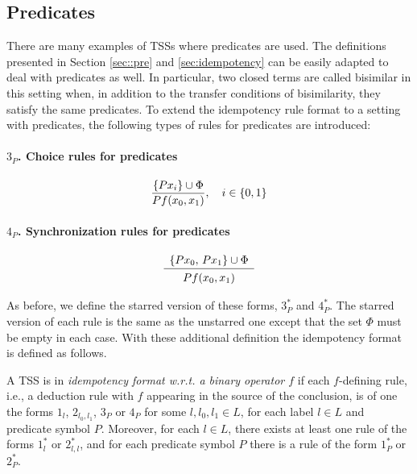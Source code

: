 
\subsection{Predicates\label{sec::pred}}

There are many examples of TSSs where predicates are used.
The definitions presented in Section \ref{sec::pre} and  \ref{sec:idempotency} can be easily adapted to deal with predicates as well.
In particular, two closed terms are called bisimilar in this setting when,
in addition to the transfer conditions of bisimilarity, they satisfy the same predicates.
To extend the idempotency rule format to a setting with predicates, the following types of rules for predicates are introduced:

\paragraph{$3_P$. Choice rules for predicates}
\[
    \sosrule[i\in\{0,1\}]{\{P x_i\}\cup\Phi}{P f(x_0,x_1)} \\
\]
\paragraph{$4_{P}$. Synchronization rules for predicates}
\[
    \sosrule{\{P x_0,\, P x_1\}\cup\Phi}{P f(x_0,x_1)}
\]

As before, we define the starred version of these forms, $3_P^*$ and $4_{P}^*$. The starred version of each rule is the same as the unstarred one except that the set $\Phi$ must be
empty in each case. With these additional definition the idempotency format is defined as follows.

A TSS is in \emph{idempotency format w.r.t. a binary operator $f$} if each \mbox{$f$-defining} rule, i.e., a deduction rule with $f$ appearing in the source of the conclusion, is of one the forms $1_l$, $2_{l_0,l_1}$, $3_P$ or $4_P$ for some $l, l_0, l_1 \in L$, for each label $l \in L$  and predicate symbol $P$. Moreover, for each $l \in L$, there exists at least one rule of the forms $1_l^*$ or $2_{l,l}^*$, and for each predicate symbol $P$ there is a rule of the form $1^*_P$ or $2_P^*$.

